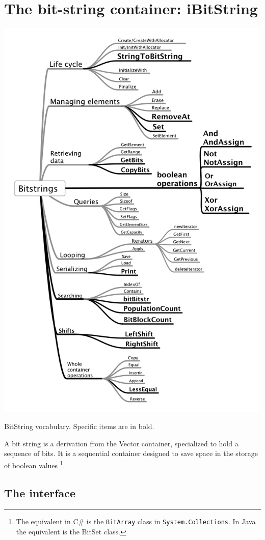 \documentclass[12pt,a4paper]{memoir} %
\newcommand{\container}{}
\begin{document}
{{\section{The bit-string container: iBitString}
\renewcommand{\container}{BitString}
\includegraphics[scale=0.37]{bitstrings.png}\par
\hfill BitString vocabulary. Specific items are in bold.\par
A bit string is a derivation from the Vector container, specialized to hold a sequence of bits. It is a sequential container designed to save space in the storage of boolean values
\footnote{
The equivalent in C\# is the \texttt{BitArray} class in \texttt{System.Collections}. In Java the equivalent is the BitSet class.
}. 
\subsection{The interface}

}}
\end{document}
